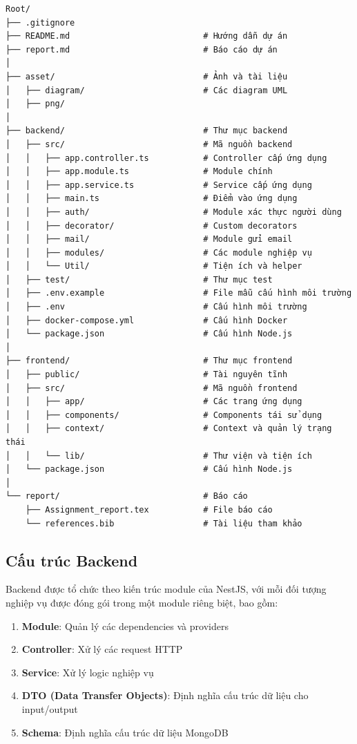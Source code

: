 \documentclass[a4paper]{article}
\begin{document}
\begin{itemize}
\begin{verbatim}
Root/
├── .gitignore 
├── README.md                           # Hướng dẫn dự án
├── report.md                           # Báo cáo dự án
│
├── asset/                              # Ảnh và tài liệu
│   ├── diagram/                        # Các diagram UML
│   ├── png/
│
├── backend/                            # Thư mục backend
│   ├── src/                            # Mã nguồn backend
│   │   ├── app.controller.ts           # Controller cấp ứng dụng
│   │   ├── app.module.ts               # Module chính
│   │   ├── app.service.ts              # Service cấp ứng dụng
│   │   ├── main.ts                     # Điểm vào ứng dụng
│   │   ├── auth/                       # Module xác thực người dùng
│   │   ├── decorator/                  # Custom decorators
│   │   ├── mail/                       # Module gửi email
│   │   ├── modules/                    # Các module nghiệp vụ
│   │   └── Util/                       # Tiện ích và helper
│   ├── test/                           # Thư mục test
│   ├── .env.example                    # File mẫu cấu hình môi trường
│   ├── .env                            # Cấu hình môi trường
│   ├── docker-compose.yml              # Cấu hình Docker
│   └── package.json                    # Cấu hình Node.js
│
├── frontend/                           # Thư mục frontend
│   ├── public/                         # Tài nguyên tĩnh
│   ├── src/                            # Mã nguồn frontend
│   │   ├── app/                        # Các trang ứng dụng
│   │   ├── components/                 # Components tái sử dụng
│   │   ├── context/                    # Context và quản lý trạng thái
│   │   └── lib/                        # Thư viện và tiện ích
│   └── package.json                    # Cấu hình Node.js
│
└── report/                             # Báo cáo
    ├── Assignment_report.tex           # File báo cáo
    └── references.bib                  # Tài liệu tham khảo
\end{verbatim}

\subsection{Cấu trúc Backend}

Backend được tổ chức theo kiến trúc module của NestJS, với mỗi đối tượng nghiệp vụ được đóng gói trong một module riêng biệt, bao gồm:

\begin{enumerate}
    \item \textbf{Module}: Quản lý các dependencies và providers
    \item \textbf{Controller}: Xử lý các request HTTP
    \item \textbf{Service}: Xử lý logic nghiệp vụ
    \item \textbf{DTO (Data Transfer Objects)}: Định nghĩa cấu trúc dữ liệu cho input/output
    \item \textbf{Schema}: Định nghĩa cấu trúc dữ liệu MongoDB
\end{enumerate}


\end{itemize}
\end{document}
